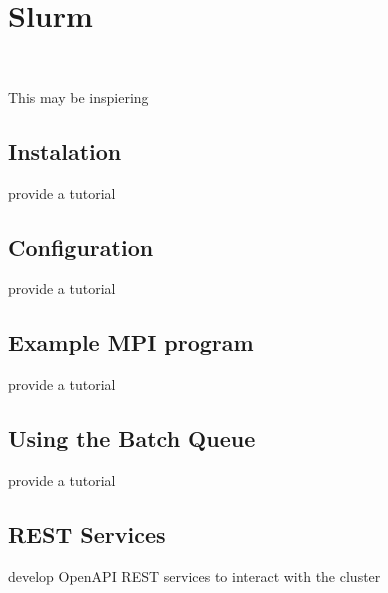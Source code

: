 \chapter{Slurm}

\FILENAME\

This may be inspiering 



\section{Instalation}

\begin{exercise}
provide a tutorial 
\end{exercise}

\section{Configuration}

\begin{exercise}
provide a tutorial 
\end{exercise}

\section{Example MPI program}

\begin{exercise}
provide a tutorial 
\end{exercise}

\section{Using the Batch Queue}

\begin{exercise}
provide a tutorial 
\end{exercise}

\section{REST Services}

\begin{exercise}
develop OpenAPI REST services to interact with the cluster
\end{exercise}




